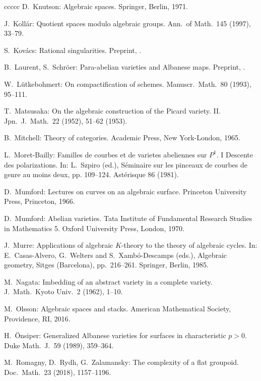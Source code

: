 \documentclass[oneside, 12pt]{amsart}
\theoremstyle{definition}
\theoremstyle{remark}
\begin{document}
\begin{thebibliography}{ccccc}
D.\ Knutson:
Algebraic spaces.
Springer, Berlin, 1971.

J.\ Koll\'ar:
Quotient spaces modulo algebraic groups. 
Ann.\ of Math.\  145 (1997), 33--79. 

S.\   Kov\'acs:
Rational singularities.
Preprint, .

B.\ Laurent, S.\ Schr\"oer:
Para-abelian varieties and  Albanese maps.
Preprint, .

W.\ L\"utkebohmert:
On compactification of schemes.
Manuscr.\ Math.\ 80 (1993),  95--111.

T.\ Matsusaka:
On the algebraic construction of the Picard variety. II.
Jpn.\ J.\ Math.\ 22 (1952), 51--62 (1953). 

B.\ Mitchell:
Theory of categories. 
Academic Press, New York-London, 1965.

L.\ Moret-Bailly:
Familles de courbes et de varietes abeliennes sur $P^1$.  I Descente des polarizations.
In: 
L.\ Szpiro (ed.), S\'eminaire sur les pinceaux de courbes de genre au moins deux, pp. 109--124.
Ast\'erisque 86 (1981). 

D.\ Mumford:
Lectures on curves on an algebraic surface.
Princeton University Press, Princeton, 1966.

D.\ Mumford:
Abelian varieties.
Tata Institute of Fundamental Research Studies in Mathematics 5.
Oxford University Press,  London, 1970.

J.\ Murre:
Applications of algebraic $K$-theory to the theory of algebraic cycles. 
In:
E.\ Casas-Alvero, G.\ Welters and S.\ Xamb\'o-Descamps (eds.), Algebraic geometry, Sitges (Barcelona), pp.\ 216--261.
Springer, Berlin, 1985. 

M.\ Nagata:
Imbedding of an abstract variety in a complete variety.
J.\ Math.\ Kyoto Univ.\ 2 (1962), 1--10.

M.\ Olsson:
Algebraic spaces and stacks.
American Mathematical Society, Providence, RI, 2016.

H.\ \"Onsiper:
Generalized Albanese varieties for surfaces in characteristic $p>0$.
Duke Math.\ J.\ 59 (1989),  359--364. 

M.\ Romagny, D.\ Rydh, G.\ Zalamansky:
The complexity of a flat groupoid.  
Doc.\ Math.\ 23 (2018), 1157--1196. 


\end{thebibliography}
\end{document}
